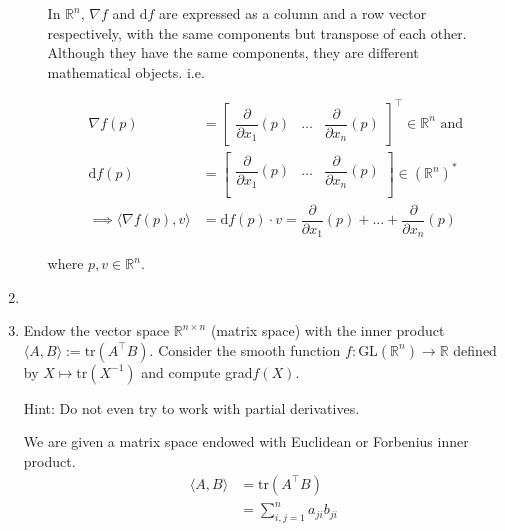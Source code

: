 \documentclass{article}
\begin{document}
\begin{enumerate}[start=9]
\begin{enumerate}
\begin{ans_box}
    In $\mathbb{R}^n$, $\nabla f$ and $\text{d}f$ are expressed as a column and a row vector respectively, with the same components but transpose of each other. Although they have the same components, they are different mathematical objects. i.e.

    \begin{equation*}
      \begin{split}
        \nabla f(p)&=
        \begin{bmatrix}
          \dfrac{\partial}{\partial x_{1}}(p)&\hdots&\dfrac{\partial}{\partial x_{n}}(p)
        \end{bmatrix}^{\top}\in\mathbb{R}^{n}\text{ and}\\
        \text{d}f(p)&=
        \begin{bmatrix}
          \dfrac{\partial}{\partial x_{1}}(p)&\hdots&\dfrac{\partial}{\partial x_{n}}(p)\\
        \end{bmatrix}\in(\mathbb{R}^{n})^{*}\\
        \implies\langle\nabla f(p), v\rangle&=\text{d}f(p)\cdot v=\dfrac{\partial}{\partial x_{1}}(p)+\hdots+\dfrac{\partial}{\partial x_{n}}(p)
      \end{split}
    \end{equation*}

    where $p,v\in\mathbb{R}^{n}$.
    \end{ans_box}
  \end{enumerate}

  \item

  \item Endow the vector space $\mathbb{R}^{n\times n}$ (matrix space) with the inner product $\langle A,B\rangle:=\text{tr}(A^{\top}B)$. Consider the smooth function $f:\text{GL}(\mathbb{R}^{n})\rightarrow\mathbb{R}$ defined by $X\mapsto\text{tr}(X^{-1})$ and compute grad$f(X)$.

  {\footnotesize Hint: Do not even try to work with partial derivatives.}

  \begin{ans_box}
    We are given a matrix space endowed with Euclidean or Forbenius inner product.
    \begin{equation*}
      \begin{split}
        \langle A,B\rangle&=\text{tr}(A^{\top}B)\\
        &=\sum_{i,j=1}^{n}a_{ji}b_{ji}
      \end{split}
    \end{equation*}


\end{ans_box}
\end{enumerate}
\end{document}

